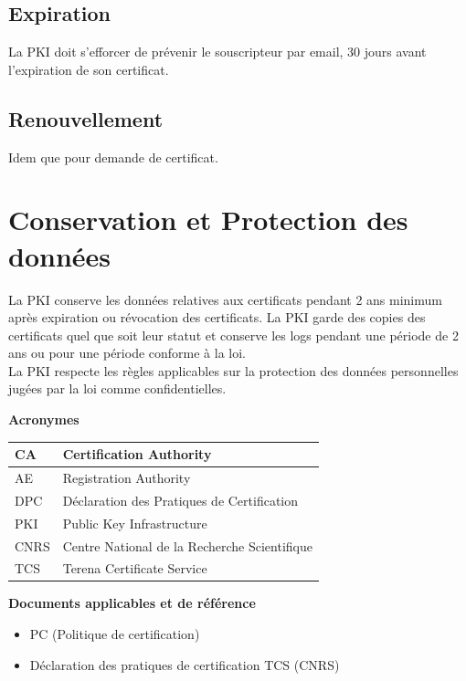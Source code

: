 \documentclass[a4paper,11pt,french]{book}
\begin{document}
\subsection{Expiration}
La PKI doit s'efforcer de prévenir le souscripteur par email, 30 jours avant l'expiration de son certificat.

\subsection{Renouvellement}
Idem que pour demande de certificat.

\section{Conservation et Protection des données}
La PKI conserve les données relatives aux certificats pendant 2 ans minimum après expiration ou révocation des certificats. La PKI garde des copies des certificats quel que soit leur statut et conserve les logs pendant une période de 2 ans ou pour une période conforme à la loi. 
\\La PKI respecte les règles applicables sur la protection des données personnelles jugées par la loi comme confidentielles.


\newpage
\textbf {Acronymes}


\begin{tabular}{|l|p{10cm}|}

\hline
CA & Certification Authority
\\
\hline
AE  & Registration Authority 
\\

\hline
DPC & Déclaration des Pratiques de Certification
\\
\hline
PKI & Public Key Infrastructure
\\
\hline
CNRS & Centre National de la Recherche Scientifique
\\
\hline
TCS & Terena Certificate Service
\\
\hline
\end{tabular}



\newpage
\textbf {Documents applicables et de référence}
\begin{itemize}
\item PC (Politique de certification)
\item Déclaration des pratiques de certification TCS (CNRS)

\end{itemize}
\end{document}
